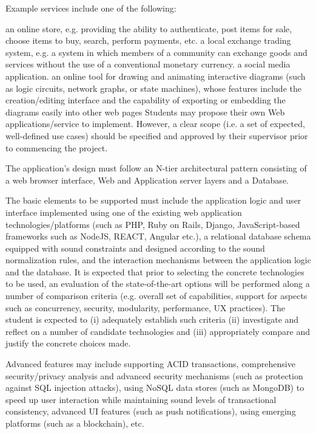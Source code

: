 \documentclass[]{final_report}
\begin{document}
Example services include one of the following:

an online store, e.g. providing the ability to authenticate, post items for sale, choose items to buy, search, perform payments, etc.
a local exchange trading system, e.g. a system in which members of a community can exchange goods and services without the use of a conventional monetary currency.
a social media application.
an online tool for drawing and animating interactive diagrams (such as logic circuits, network graphs, or state machines), whose features include the creation/editing interface and the capability of exporting or embedding the diagrams easily into other web pages
Students may propose their own Web applications/service to implement. However, a clear scope (i.e. a set of expected, well-defined use cases) should be specified and approved by their supervisor prior to commencing the project.

The application’s design must follow an N-tier architectural pattern consisting of a web browser interface, Web and Application server layers and a Database.

The basic elements to be supported must include the application logic and user interface implemented using one of the existing web application technologies/platforms (such as PHP, Ruby on Rails, Django, JavaScript-based frameworks such as NodeJS, REACT, Angular etc.), a relational database schema equipped with sound constraints and designed according to the sound normalization rules, and the interaction mechanisms between the application logic and the database. It is expected that prior to selecting the concrete technologies to be used, an evaluation of the state-of-the-art options will be performed along a number of comparison criteria (e.g. overall set of capabilities, support for aspects such as concurrency, security, modularity, performance, UX practices). The student is expected to (i) adequately establish such criteria (ii) investigate and reflect on a number of candidate technologies and (iii) appropriately compare and justify the concrete choices made.

Advanced features may include supporting ACID transactions, comprehensive security/privacy analysis and advanced security mechanisms (such as protection against SQL injection attacks), using NoSQL data stores (such as MongoDB) to speed up user interaction while maintaining sound levels of transactional consistency, advanced UI features (such as push notifications), using emerging platforms (such as a blockchain), etc. 
\end{document}
